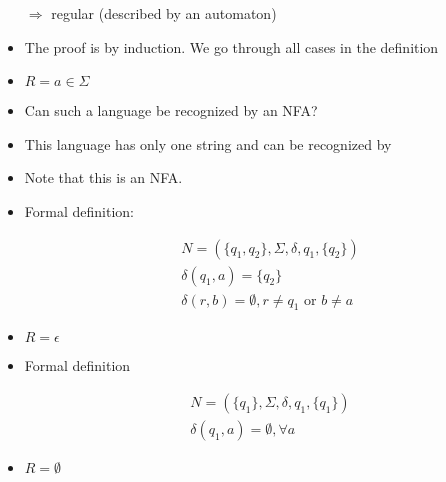 \begin{frame}[allowframebreaks]
\begin{itemize}
$\Rightarrow$ regular (described by an automaton)
\item The proof is by induction. We go through all cases in the
  definition
\item $R = a \in \Sigma$
\item [] Can such a language be recognized by an NFA?
\item [] This language has only one string and can be recognized by

\begin{center}
\end{center}

\item[] Note that this is an NFA. 
\item[] Formal definition:

  \begin{equation*}
    \begin{split}
& N = (\{q_1,q_2\}, \Sigma, \delta, q_1, \{q_2\}) \\
& \delta(q_1,a)= \{q_2\} \\
& \delta(r,b)=\emptyset, r \neq q_1\mbox{ or } b \neq a
\end{split}
\end{equation*}
\item $R=\epsilon$

\begin{center}
\end{center}
  
\item [] Formal definition

  \begin{equation*}
    \begin{split}
& N=(\{q_1\},\Sigma,\delta, q_1, \{q_1\}) \\
& \delta(q_1,a)=\emptyset, \forall a
\end{split}
\end{equation*}

\item $R=\emptyset$

\begin{center}
\end{center}
  

\end{itemize}
\end{frame}

